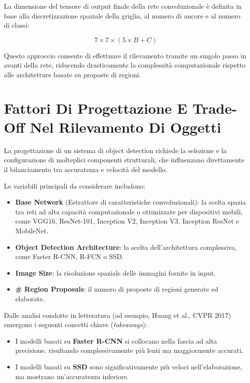 ﻿\documentclass[11pt, a4paper]{article}
\begin{document}

La dimensione del tensore di output finale della rete convoluzionale è definita in base alla discretizzazione spaziale della griglia, al numero di ancore e al numero di classi:

\[
\boxed{7 \times 7 \times (5 \times B + C)}
\]

Questo approccio consente di effettuare il rilevamento tramite un singolo passo in avanti della rete, riducendo drasticamente la complessità computazionale rispetto alle architetture basate su proposte di regioni.


\newpage

\section{Fattori Di Progettazione E Trade-Off Nel Rilevamento Di Oggetti}

La progettazione di un sistema di object detection richiede la selezione e la configurazione di molteplici componenti strutturali, che influenzano direttamente il bilanciamento tra accuratezza e velocità del modello.

Le variabili principali da considerare includono:
\begin{itemize}
    \item \textbf{Base Network} (Estrattore di caratteristiche convoluzionali): la scelta spazia tra reti ad alta capacità computazionale o ottimizzate per dispositivi mobili, come VGG16, ResNet-101, Inception V2, Inception V3, Inception ResNet e MobileNet.
    \item \textbf{Object Detection Architecture}: la scelta dell'architettura complessiva, come Faster R-CNN, R-FCN o SSD.
    \item \textbf{Image Size}: la risoluzione spaziale delle immagini fornite in input.
    \item \textbf{\# Region Proposals}: il numero di proposte di regioni generate ed elaborate.
\end{itemize}

Dalle analisi condotte in letteratura (ad esempio, Huang et al., CVPR 2017) emergono i seguenti concetti chiave (\emph{takeaways}):
\begin{itemize}
    \item I modelli basati su \textbf{Faster R-CNN} si collocano nella fascia ad alta precisione, risultando complessivamente più lenti ma maggiormente accurati.
    \item I modelli basati su \textbf{SSD} sono significativamente più veloci nell'elaborazione, ma mostrano un'accuratezza inferiore.
\end{itemize}
\end{document}
